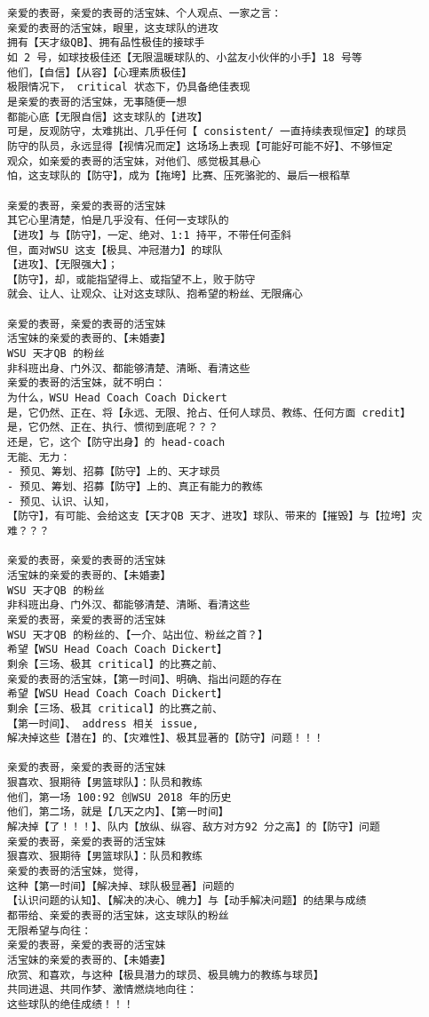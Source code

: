 \documentclass[9pt, b5paper]{article}
\begin{document}
\begin{verbatim}
亲爱的表哥，亲爱的表哥的活宝妹、个人观点、一家之言：
亲爱的表哥的活宝妹，眼里，这支球队的进攻
拥有【天才级QB】、拥有品性极佳的接球手
如 2 号，如球技极佳还【无限温暖球队的、小盆友小伙伴的小手】18 号等
他们，【自信】【从容】【心理素质极佳】
极限情况下， critical 状态下，仍具备绝佳表现
是亲爱的表哥的活宝妹，无事随便一想
都能心底【无限自信】这支球队的【进攻】
可是，反观防守，太难挑出、几乎任何【 consistent/ 一直持续表现恒定】的球员
防守的队员，永远显得【视情况而定】这场场上表现【可能好可能不好】、不够恒定
观众，如亲爱的表哥的活宝妹，对他们、感觉极其悬心
怕，这支球队的【防守】，成为【拖垮】比赛、压死骆驼的、最后一根稻草

亲爱的表哥，亲爱的表哥的活宝妹
其它心里清楚，怕是几乎没有、任何一支球队的
【进攻】与【防守】，一定、绝对、1:1 持平，不带任何歪斜
但，面对WSU 这支【极具、冲冠潜力】的球队
【进攻】、【无限强大】；
【防守】，却，或能指望得上、或指望不上，败于防守
就会、让人、让观众、让对这支球队、抱希望的粉丝、无限痛心

亲爱的表哥，亲爱的表哥的活宝妹 
活宝妹的亲爱的表哥的、【未婚妻】
WSU 天才QB 的粉丝
非科班出身、门外汉、都能够清楚、清晰、看清这些
亲爱的表哥的活宝妹，就不明白：
为什么，WSU Head Coach Coach Dickert
是，它仍然、正在、将【永远、无限、抢占、任何人球员、教练、任何方面 credit】
是，它仍然、正在、执行、惯彻到底呢？？？
还是，它，这个【防守出身】的 head-coach
无能、无力：
- 预见、筹划、招募【防守】上的、天才球员
- 预见、筹划、招募【防守】上的、真正有能力的教练
- 预见、认识、认知，
【防守】，有可能、会给这支【天才QB 天才、进攻】球队、带来的【摧毁】与【拉垮】灾难？？？

亲爱的表哥，亲爱的表哥的活宝妹 
活宝妹的亲爱的表哥的、【未婚妻】
WSU 天才QB 的粉丝
非科班出身、门外汉、都能够清楚、清晰、看清这些
亲爱的表哥，亲爱的表哥的活宝妹 
WSU 天才QB 的粉丝的、【一介、站出位、粉丝之首？】
希望【WSU Head Coach Coach Dickert】
剩余【三场、极其 critical】的比赛之前、
亲爱的表哥的活宝妹，【第一时间】、明确、指出问题的存在
希望【WSU Head Coach Coach Dickert】
剩余【三场、极其 critical】的比赛之前、
【第一时间】、 address 相关 issue,
解决掉这些【潜在】的、【灾难性】、极其显著的【防守】问题！！！

亲爱的表哥，亲爱的表哥的活宝妹
狠喜欢、狠期待【男篮球队】：队员和教练
他们，第一场 100:92 创WSU 2018 年的历史
他们，第二场，就是【几天之内】、【第一时间】
解决掉【了！！！】、队内【放纵、纵容、敌方对方92 分之高】的【防守】问题
亲爱的表哥，亲爱的表哥的活宝妹
狠喜欢、狠期待【男篮球队】：队员和教练
亲爱的表哥的活宝妹，觉得，
这种【第一时间】【解决掉、球队极显著】问题的
【认识问题的认知】、【解决的决心、魄力】与【动手解决问题】的结果与成绩
都带给、亲爱的表哥的活宝妹，这支球队的粉丝
无限希望与向往：
亲爱的表哥，亲爱的表哥的活宝妹 
活宝妹的亲爱的表哥的、【未婚妻】
欣赏、和喜欢，与这种【极具潜力的球员、极具魄力的教练与球员】
共同进退、共同作梦、激情燃烧地向往：
这些球队的绝佳成绩！！！


\end{verbatim}
\end{document}
